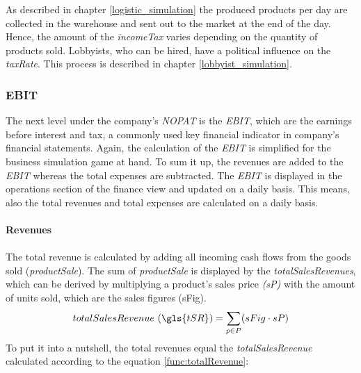 As described in chapter \ref{logistic_simulation} the produced products per day are collected in the warehouse and sent out to the market at the end of the day. Hence, the amount of the \textit{incomeTax} varies depending on the quantity of products sold. Lobbyists, who can be hired, have a political influence on the \textit{taxRate}. This process is described in chapter \ref{lobbyist_simulation}.

\subsubsection{EBIT}

The next level under the company's \textit{NOPAT} is the \textit{EBIT}, which are the earnings before interest and tax, a commonly used key financial indicator in company's financial statements. \cite{lee_e_2006} Again, the calculation of the \textit{EBIT} is simplified for the business simulation game at hand. To sum it up, the revenues are added to the \textit{EBIT} whereas the total expenses are subtracted. The \textit{EBIT} is displayed in the operations section of the finance view and updated on a daily basis. This means, also the total revenues and total expenses are calculated on a daily basis.\\
\\
\textbf{Revenues}\\
\\
The total revenue is calculated by adding all incoming cash flows from the goods sold (\textit{productSale}). The sum of \textit{productSale} is displayed by the \textit{totalSalesRevenues}, which can be derived by multiplying a product’s sales price \textit{(sP)} with the amount of units sold, which are the sales figures (\gls{sFig}). 
    \begin{equation}
        totalSalesRevenue~(\gls{tSR}) = \sum_{p \in P}(sFig \cdot sP) 
    \end{equation}
To put it into a nutshell, the total revenues equal the \textit{totalSalesRevenue} calculated according to the equation \ref{func:totalRevenue}:

